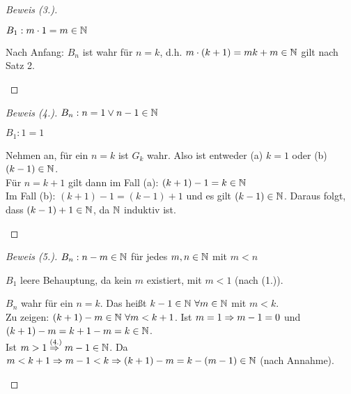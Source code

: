 \begin{satz}
\begin{proof}[Beweis (3.)]
        \begin{induktionsanfang}
            $B_1: m\cdot 1=m \in \mathbb{N}$
        \end{induktionsanfang}
        \begin{induktionsschritt}
            Nach Anfang: $B_n$ ist wahr für $n=k$, d.h. $m\cdot(k+1) = mk + m \in\mathbb{N}$ gilt nach Satz 2.\qedhere
        \end{induktionsschritt}
    \end{proof}
    \begin{proof}[Beweis (4.)]
        $B_n: n= 1 \lor n-1\in\mathbb{N}$\\
        \begin{induktionsanfang}
            $B_1: 1=1$
        \end{induktionsanfang}
        \begin{induktionsschritt}
            Nehmen an, für ein $n=k$ ist $G_k$ wahr. Also ist entweder (a) $k=1$ oder (b) $(k-1)\in\mathbb{N}$.\\
            Für $n=k+1$ gilt dann im Fall (a): $(k+1)-1 = k\in\mathbb{N}$\\
            Im Fall (b): $(k+1)-1 = (k-1)+1$ und es gilt $(k-1)\in\mathbb{N}$. Daraus folgt, dass $(k-1)+1\in\mathbb{N}$, da $\mathbb{N}$ induktiv ist.\qedhere
        \end{induktionsschritt}
    \end{proof}
    \begin{proof}[Beweis (5.)]
        $B_n: n-m\in\mathbb{N}$ für jedes $m,n\in\mathbb{N}$ mit $m<n$\\
        \begin{induktionsanfang}
            $B_1$ leere Behauptung, da kein $m$ existiert, mit $m<1$ (nach (1.)).
        \end{induktionsanfang}
        \begin{induktionsschritt}
            $B_n$ wahr für ein $n=k$. Das heißt $k-1\in\mathbb{N}~\forall m\in\mathbb{N}$ mit $m<k$.\\
            Zu zeigen: $(k+1)-m\in\mathbb{N}~\forall m<k+1$. Ist $m=1\Rightarrow{} m-1 = 0$ und $(k+1)-m = k+1-m=k\in\mathbb{N}$.\\
            Ist $m>1 \overset{\text{(4.)}}{\Rightarrow{}} m-1\in\mathbb{N}$. Da $m<k+1 \Rightarrow{} m-1<k \Rightarrow{} (k+1)-m = k-(m-1)\in\mathbb{N}$ (nach Annahme).\qedhere
        \end{induktionsschritt}
    \end{proof}
\end{satz}

